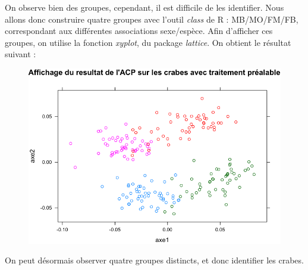 \documentclass[a4paper,11pt]{article}
\begin{document}
\noindent On observe bien des groupes, cependant, il est difficile de les identifier. Nous allons donc construire quatre groupes avec l'outil \textit{class} de R : MB/MO/FM/FB, correspondant aux différentes associations sexe/espèce. Afin d'afficher ces groupes, on utilise la fonction \textit{xyplot}, du package \textit{lattice}. On obtient le résultat suivant : 

\begin{figure}[H]
\begin{center}
\includegraphics[width=.7\textwidth]{img/acpcool}
\end{center}
\end{figure}

\noindent On peut désormais observer quatre groupes distincts, et donc identifier les crabes.


 
\end{document}
